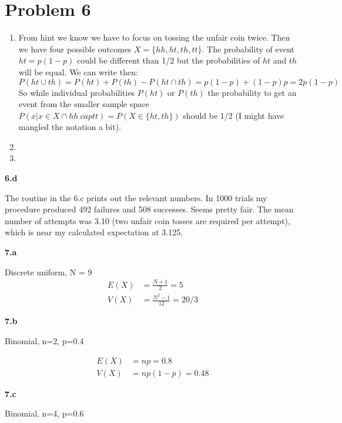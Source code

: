 \documentclass{article}
\newcommand{\1}{\mathbf{1}}
\begin{document}
\newpage
\section*{Problem 6}
\begin{enumerate}
    \item From hint we know we have to focus on tossing the unfair coin twice. Then we have four possible outcomes $X=\{hh, ht, th, tt\}$. The probability of event $ht = p(1-p)$ could be different than 1/2 but the probabilities of $ht$ and $th$ will be equal. We can write then:
    $$P(ht \cup th) = P(ht) + P(th) - P(ht \cap th) = p(1-p) + (1-p)p = 2p(1-p)$$
    So while individual probabilities $P(ht)$ or $P(th)$ the probability to get an event from the smaller sample space $P(x|x \in X \cap hh \ cap tt) = P(X\in\{ht, th\})$ should be 1/2 (I might have mangled the notation a bit).
    
    \item 
    
    \item 
\end{enumerate}


\vspace{\baselineskip}
\noindent \textbf{\large 6.d}

The routine in the 6.c prints out the relevant numbers.  In 1000 trials my procedure produced 492 failures and 508 successes.  Seems pretty fair.  The mean number of attempts was 3.10 (two unfair coin tosses are required per attempt), which is near my calculated expectation at 3.125.

\vspace{\baselineskip}
\noindent \textbf{\large 7.a}

Discrete uniform, N = 9
\begin{align*}
E(X) &= \frac{N+1}{2} = 5 \\
V(X) &= \frac{N^2-1}{12} = 20/3
\end{align*}

\vspace{\baselineskip}
\noindent \textbf{\large 7.b}

Binomial, n=2, p=0.4

\begin{align*}
E(X) &= np = 0.8 \\
V(X) &= np(1-p) = 0.48
\end{align*}

\vspace{\baselineskip}
\noindent \textbf{\large 7.c}

Binomial, n=4, p=0.6
\end{document}
